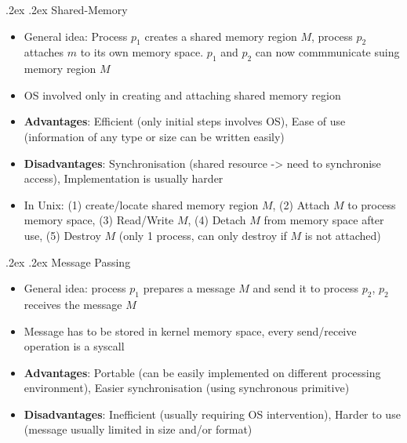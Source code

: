 \documentclass[10pt,landscape,a4paper]{article}
\makeatletter
\renewcommand{\subsection}{\@startsection{subsection}{1}{0mm}%
  {.2ex}%
  {.2ex}%
{\sffamily\bfseries}}
\makeatother
\begin{document}
\begin{multicols*}{4}
  \subsection{Shared-Memory}
  \begin{itemize}
    \item General idea: Process $p_1$ creates a shared memory region $M$, process $p_2$ attaches $m$ to its own memory space. $p_1$ and $p_2$ can now commmunicate suing memory region $M$
    \item OS involved only in creating and attaching shared memory region
    \item \textbf{Advantages}: Efficient (only initial steps involves OS), Ease of use (information of any type or size can be written easily)
    \item \textbf{Disadvantages}: Synchronisation (shared resource -> need to synchronise access), Implementation is usually harder
    \item In Unix: (1) create/locate shared memory region $M$, (2) Attach $M$ to process memory space, (3) Read/Write $M$, (4) Detach $M$ from memory space after use, (5) Destroy $M$ (only 1 process, can only destroy if $M$ is not attached)
  \end{itemize}
  \subsection{Message Passing}
  \begin{itemize}
    \item General idea: process $p_1$ prepares a message $M$ and send it to process $p_2$, $p_2$ receives the message $M$
    \item Message has to be stored in kernel memory space, every send/receive operation is a syscall
    \item \textbf{Advantages}: Portable (can be easily implemented on different processing environment), Easier synchronisation (using synchronous primitive)
    \item \textbf{Disadvantages}: Inefficient (usually requiring OS intervention), Harder to use (message usually limited in size and/or format)
  \end{itemize}

\end{multicols*}
\end{document}
